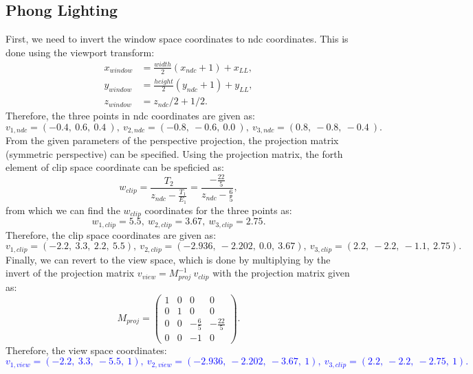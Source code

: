 \documentclass[11pt]{article}
\begin{document}
\subsection{Phong Lighting}
First, we need to invert the window space coordinates to ndc coordinates. This is done using the viewport transform:
\begin{align*}
    x_{window} &= \frac{width}{2}(x_{ndc}+1)+x_{LL},\\
    y_{window} &= \frac{height}{2}(y_{ndc}+1)+y_{LL},\\
    z_{window} &= z_{ndc}/2 + 1/2.
\end{align*}
Therefore, the three points in ndc coordinates are given as: \[v_{1,ndc} = (-0.4,\ 0.6,\ 0.4\ ),\ v_{2,ndc} = (-0.8,\ -0.6,\ 0.0\ ),\ v_{3,ndc} = (0.8,\ -0.8,\ -0.4\ ).\]
From the given parameters of the perspective projection, the projection matrix (symmetric perspective) can be specified. Using the projection matrix, the forth element of clip space coordinate can be speficied as:
\begin{equation}
    w_{clip} = \frac{T_2}{z_{ndc}-\frac{T_1}{E_1}} = \frac{-\frac{22}{5}}{z_{ndc} - \frac{6}{5}},
\end{equation}
from which we can find the $w_{clip}$ coordinates for the three points as: \[w_{1,clip}= 5.5,\ w_{2,clip}= 3.67,\ w_{3,clip}= 2.75.\]
Therefore, the clip space coordinates are given as:
\[v_{1,clip} = (-2.2,\ 3.3,\ 2.2,\ 5.5),\ v_{2,clip} = (-2.936,\ -2.202,\ 0.0,\ 3.67),\ v_{3,clip} = (2.2,\ -2.2,\ -1.1,\ 2.75).\]
Finally, we can revert to the view space, which is done by multiplying by the invert of the projection matrix $v_{view} = M_{proj}^{-1}\ v_{clip}$ with the projection matrix given as:
\begin{equation*}
    M_{proj} = \begin{pmatrix}
        1 & 0 & 0 & 0\\[2pt]
        0 & 1 & 0 & 0\\[2pt]
        0 & 0 & -\frac{6}{5} & -\frac{22}{5}\\[2pt]
        0 & 0 & -1 & 0
    \end{pmatrix}.
\end{equation*}
Therefore, the view space coordinates:
\textcolor{blue}{\[v_{1,view} = (-2.2,\ 3.3,\ -5.5,\ 1),\ v_{2,view} = (-2.936,\ -2.202,\ -3.67,\ 1),\ v_{3,clip} = (2.2,\ -2.2,\ -2.75,\ 1).\]}
\end{document}
